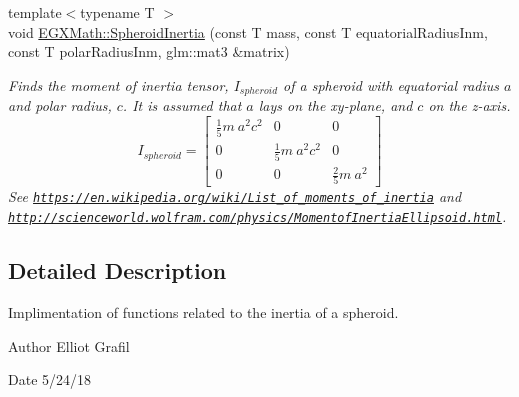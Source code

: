 \begin{DoxyCompactItemize}
{\footnotesize template$<$typename T $>$ }\\void \mbox{\hyperlink{group___e_g_x_math-_geometry-3_d-_spheroid-_inertia_ga0d621d59c21aeddf2ed5e9050aa2eeb8}{E\+G\+X\+Math\+::\+Spheroid\+Inertia}} (const T mass, const T equatorial\+Radius\+Inm, const T polar\+Radius\+Inm, glm\+::mat3 \&matrix)
\begin{DoxyCompactList}\small\item\em Finds the moment of inertia tensor, $I_{spheroid}$ of a spheroid with equatorial radius $a$ and polar radius, $c$. It is assumed that $a$ lays on the xy-\/plane, and $c$ on the z-\/axis. \[ I_{spheroid}=\begin{bmatrix} \frac{1}{5}m\ a^2c^2 & 0 & 0\\ 0 & \frac{1}{5}m\ a^2c^2 & 0\\ 0 & 0 & \frac{2}{5}m\ a^2 \end{bmatrix} \] See \href{https://en.wikipedia.org/wiki/List_of_moments_of_inertia}{\tt https\+://en.\+wikipedia.\+org/wiki/\+List\+\_\+of\+\_\+moments\+\_\+of\+\_\+inertia} and \href{http://scienceworld.wolfram.com/physics/MomentofInertiaEllipsoid.html}{\tt http\+://scienceworld.\+wolfram.\+com/physics/\+Momentof\+Inertia\+Ellipsoid.\+html}. \end{DoxyCompactList}\end{DoxyCompactItemize}


\subsection{Detailed Description}
Implimentation of functions related to the inertia of a spheroid. 

\begin{DoxyAuthor}{Author}
Elliot Grafil 
\end{DoxyAuthor}
\begin{DoxyDate}{Date}
5/24/18 
\end{DoxyDate}
